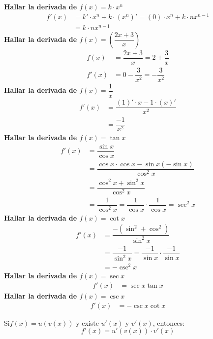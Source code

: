 \documentclass[12pt,a4paper,fleqn]{article}
\begin{document}
\textbf{Hallar la derivada de $f(x)=k \cdot x^n$}
\begin{align*}
	f'(x) & = k'\cdot x^n + k\cdot (x^n)'=(0)\cdot x^n + k \cdot nx^{n-1} \\
	      & = k \cdot nx^{n-1}
\end{align*}
\textbf{Hallar la derivada de $f(x)=\left(\dfrac{2x+3}{x}\right)$}
\begin{align*}
	f(x)  & = \dfrac{2x+3}{x} = 2 + \dfrac{3}{x}   \\
	f'(x) & = 0 - \dfrac{3}{x^2} = -\dfrac{3}{x^2}
\end{align*}
\textbf{Hallar la derivada de $f(x)=\dfrac{1}{x}$}
\begin{align*}
	f'(x) & = \dfrac{(1)'\cdot x - 1\cdot (x)'}{x^2} \\
	      & = \dfrac{ - 1}{x^2}
\end{align*}
\textbf{Hallar la derivada de $f(x)=\tan x$}
\begin{align*}
	f'(x) & = \dfrac{\sin x}{\cos x}                                               \\
	      & = \dfrac{\cos x \cdot \cos x - \sin x (-\sin x)}{\cos^2 x}             \\
	      & = \dfrac{\cos^2 x + \sin^2 x}{\cos^2 x}                                \\
	      & = \dfrac{1}{\cos^2 x}=\dfrac{1}{\cos x}\cdot\dfrac{1}{\cos x}=\sec^2 x
\end{align*}
\textbf{Hallar la derivada de $f(x)=\cot x$}
\begin{align*}
	f'(x) & = \dfrac{-(\sin^2 + \cos^2)}{\sin ^2 x}                           \\
	      & = \dfrac{-1}{\sin ^2 x}=\dfrac{-1}{\sin x}\cdot\dfrac{-1}{\sin x} \\
	      & = -\csc^2 x
\end{align*}
\textbf{Hallar la derivada de $f(x)=\sec x$}
\begin{align*}
	f'(x) & = \sec x \tan x
\end{align*}
\textbf{Hallar la derivada de $f(x)=\csc x$}
\begin{align*}
	f'(x) & = -\csc x \cot x
\end{align*}
\vspace{1em}
\begin{tcolorbox}[colback=white!95!blue, colframe=blue!40!black, title=Regla de la cadena]
	Si$f(x)=u(v(x))$ y existe $u'(x)$ y $v'(x)$, entonces:
	\[
		f'(x)=u'(v(x))\cdot v'(x)
	\]
\end{tcolorbox}
\end{document}
